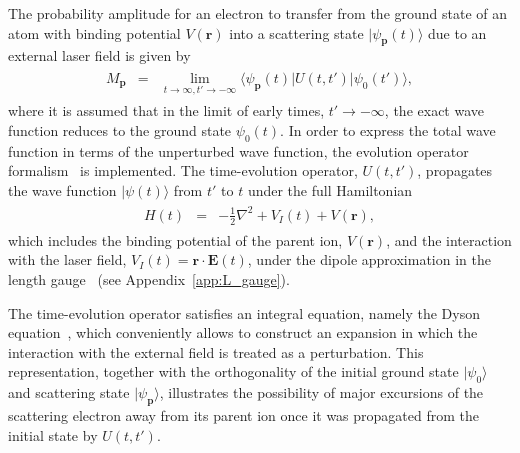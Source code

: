 The probability amplitude for an electron to transfer from the ground
state of an atom with binding potential $V(\mathbf{r})$ into a
scattering state $|\psi_{\mathbf{p}}(t)\rangle$ due to an external
laser field is given by~\cite{Kopold_1997sfa}
\begin{eqnarray}
\label{eq:matrix_element}
\begin{split}
M_{\mathbf{p}} & = & \lim_{t\to\infty,t'\to -\infty}
{\langle \psi_{\mathbf{p}}(t) | U(t,t') | \psi_{0}(t') \rangle},
\end{split}
\end{eqnarray}
where it is assumed that in the limit of early times, $t'\to -\infty$,
the exact wave function reduces to the ground state $\psi_{0}(t)$. In
order to express the total wave function in terms of the unperturbed
wave function, the evolution operator formalism~\cite{BeckerTEOp_2006}
is implemented. The time-evolution operator, $U(t,t')$, propagates the
wave function $|\psi(t)\rangle$ from $t'$ to $t$ under the full
Hamiltonian
%
\begin{eqnarray}
\label{eq:H_ati}
\begin{split}
H(t) & = & -\frac{1}{2} \nabla^{2} + V_{I}(t) + V(\mathbf{r}),
\end{split}
\end{eqnarray}
%
which includes the binding potential of the parent ion,
$V(\mathbf{r})$, and the interaction with the laser field,
$V_{I}(t)=\mathbf{r}\cdot\mathbf{E}(t)$, under the dipole
approximation in the length gauge~\cite{Kopold_1997sfa} (see
Appendix~\ref{app:L_gauge}).

The time-evolution operator satisfies an integral equation, namely the
Dyson equation~\cite{Kopold_1997sfa, cjp2010_keldysh}, which
conveniently allows to construct an expansion in which the interaction
with the external field is treated as a perturbation. This
representation, together with the orthogonality of the initial ground
state $|\psi_{0}\rangle$ and scattering state
$|\psi_{\mathbf{p}}\rangle$, illustrates the possibility of major
excursions of the scattering electron away from its parent ion once it
was propagated from the initial state by $U(t,t')$.

